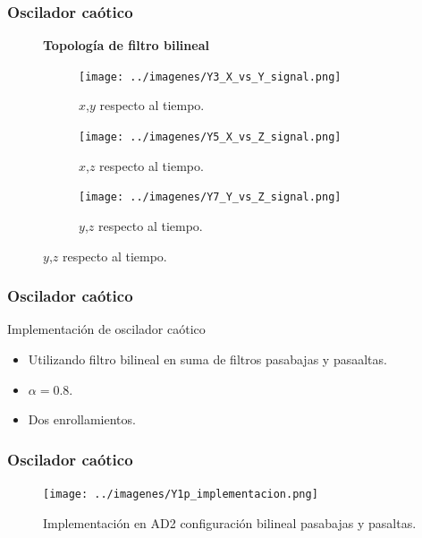 \documentclass[10pt]{beamer}
\begin{document}
	\begin{frame}
		\frametitle{Oscilador caótico}
		\begin{figure}[!ht]
		\textbf{Topología de filtro bilineal}
	\caption{Respuesta en el dominio temporal de oscilador caótico con $\alpha = 0.8$ y dos enrollamientos.}
	\label{fig:temporal_imp}
	  \begin{subfigure}[b]{0.3\textwidth}
	    \texttt{[image: ../imagenes/Y3\_X\_vs\_Y\_signal.png]}
	    \caption{$x$,$y$ respecto al tiempo.}
	    \label{fig:Y3_X_vs_Y_signal}
	  \end{subfigure}
	  \hfill
	  \begin{subfigure}[b]{0.3\textwidth}
	    \texttt{[image: ../imagenes/Y5\_X\_vs\_Z\_signal.png]}
	    \caption{$x$,$z$ respecto al tiempo.}
	    \label{fig:Y5_X_vs_Z_signal}
	  \end{subfigure}
	  \hfill
	  \begin{subfigure}[b]{0.3\textwidth}
	    \texttt{[image: ../imagenes/Y7\_Y\_vs\_Z\_signal.png]}
	    \caption{$y$,$z$ respecto al tiempo.}
	    \label{fig:Y7_Y_vs_Z_signal}
	  \end{subfigure}
	\end{figure}	
	\end{frame}
	
	
	
	
		\begin{frame}
		\frametitle{Oscilador caótico}
		\begin{block}{Implementación de oscilador caótico}
		\begin{itemize}
			\item Utilizando filtro bilineal en suma de filtros pasabajas y pasaaltas.
			\item $\alpha = 0.8$.
			\item Dos enrollamientos.
		\end{itemize}
		\end{block}
	\end{frame}	
	
	
	
	
	
	
	
	\begin{frame}
		\frametitle{Oscilador caótico}
		\begin{figure}[!ht]
		\caption{Implementación en AD2 configuración bilineal pasabajas y pasaltas.} 
		\label{fig:Y1p_implementacion}
		\centering
		\texttt{[image: ../imagenes/Y1p\_implementacion.png]}
	\end{figure}
	\end{frame}		
	
\end{document}
